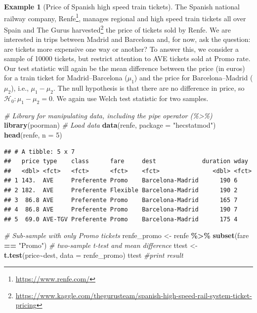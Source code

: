 \documentclass[
  11pt,
  letterpaper,
]{book}
\newenvironment{Shaded}{\begin{snugshade}}{\end{snugshade}}
\newcommand{\CommentTok}[1]{\textcolor[rgb]{0.56,0.35,0.01}{\textit{#1}}}
\newcommand{\DataTypeTok}[1]{\textcolor[rgb]{0.13,0.29,0.53}{#1}}
\newcommand{\DecValTok}[1]{\textcolor[rgb]{0.00,0.00,0.81}{#1}}
\newcommand{\KeywordTok}[1]{\textcolor[rgb]{0.13,0.29,0.53}{\textbf{#1}}}
\newcommand{\NormalTok}[1]{#1}
\newcommand{\OperatorTok}[1]{\textcolor[rgb]{0.81,0.36,0.00}{\textbf{#1}}}
\newcommand{\StringTok}[1]{\textcolor[rgb]{0.31,0.60,0.02}{#1}}
\renewcommand{\href}[2]{#2\footnote{\url{#1}}}
\theoremstyle{definition}
\theoremstyle{definition}
\newtheorem{example}{Example}[chapter]
\theoremstyle{definition}
\theoremstyle{remark}
\begin{document}
\begin{example}[Price of Spanish high speed train tickets]
\protect\hypertarget{exm:price-trains-tests}{}{\label{exm:price-trains-tests} {} }The Spanish national railway company, \href{https://www.renfe.com/}{Renfe}, manages regional and high speed train tickets all over Spain and The Gurus \href{https://www.kaggle.com/thegurusteam/spanish-high-speed-rail-system-ticket-pricing}{harvested} the price of tickets sold by Renfe. We are interested in trips between Madrid and Barcelona and, for now, ask the question: are tickets more expensive one way or another? To answer this, we consider a sample of 10000 tickets, but restrict attention to AVE tickets sold at Promo rate. Our test statistic will again be the mean difference between the price (in euros) for a train ticket for Madrid--Barcelona (\(\mu_1\)) and the price for Barcelona--Madrid (\(\mu_2\)), i.e., \(\mu_1-\mu_2\). The null hypothesis is that there are no difference in price, so \(\mathscr{H}_0: \mu_1-\mu_2=0\). We again use Welch test statistic for two samples.
\end{example}

\begin{Shaded}
\begin{Highlighting}[]
\CommentTok{\# Library for manipulating data, including the pipe operator (\%\textgreater{}\%)}
\KeywordTok{library}\NormalTok{(poorman)}
\CommentTok{\# Load data}
\KeywordTok{data}\NormalTok{(renfe, }\DataTypeTok{package =} \StringTok{"hecstatmod"}\NormalTok{)}
\KeywordTok{head}\NormalTok{(renfe, }\DataTypeTok{n =} \DecValTok{5}\NormalTok{)}
\end{Highlighting}
\end{Shaded}

\begin{verbatim}
## # A tibble: 5 x 7
##   price type    class      fare     dest             duration wday 
##   <dbl> <fct>   <fct>      <fct>    <fct>               <dbl> <fct>
## 1 143.  AVE     Preferente Promo    Barcelona-Madrid      190 6    
## 2 182.  AVE     Preferente Flexible Barcelona-Madrid      190 2    
## 3  86.8 AVE     Preferente Promo    Barcelona-Madrid      165 7    
## 4  86.8 AVE     Preferente Promo    Barcelona-Madrid      190 7    
## 5  69.0 AVE-TGV Preferente Promo    Barcelona-Madrid      175 4
\end{verbatim}

\begin{Shaded}
\begin{Highlighting}[]
\CommentTok{\# Sub{-}sample with only Promo tickets}
\NormalTok{renfe\_promo \textless{}{-}}\StringTok{ }\NormalTok{renfe }\OperatorTok{\%\textgreater{}\%}\StringTok{ }\KeywordTok{subset}\NormalTok{(fare }\OperatorTok{==}\StringTok{ "Promo"}\NormalTok{)}
\CommentTok{\# two{-}sample t{-}test and mean difference}
\NormalTok{ttest \textless{}{-}}\StringTok{ }\KeywordTok{t.test}\NormalTok{(price}\OperatorTok{\textasciitilde{}}\NormalTok{dest, }\DataTypeTok{data =}\NormalTok{ renfe\_promo)}
\NormalTok{ttest }\CommentTok{\#print result}
\end{Highlighting}
\end{Shaded}
\end{document}
